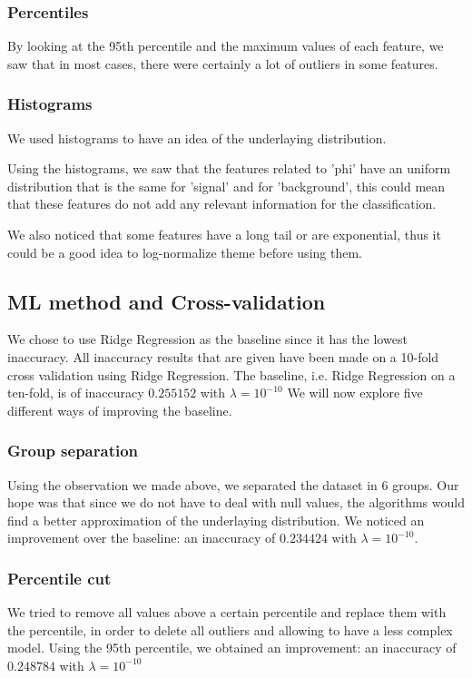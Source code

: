 \documentclass[10pt,conference,compsocconf]{IEEEtran}
\begin{document}
\subsubsection{Percentiles}

By looking at the 95th percentile and the maximum values of each feature, we saw
that in most cases, there were certainly a lot of outliers in some features.

\subsubsection{Histograms}

We used histograms to have an idea of the underlaying distribution.

Using the histograms, we saw that the features related to 'phi' have an uniform
distribution that is the same for 'signal' and for 'background', this could mean
that these features do not add any relevant information for the classification.

We also noticed that some features have a long tail or are exponential, thus it could be a good
idea to log-normalize theme before using them.

\subsection{ML method and Cross-validation}
We chose to use Ridge Regression as the baseline since it has the lowest
inaccuracy.
All inaccuracy results that are given have been made on a 10-fold cross validation
using Ridge Regression. The baseline, i.e. Ridge Regression on a ten-fold, is
of inaccuracy $0.255152$ with $\lambda = 10^{-10}$
We will now explore five different ways of improving the baseline.

\subsubsection{Group separation}
Using the observation we made above, we separated the dataset in 6 groups. Our
hope was that since we do not have to deal with null values, the algorithms
would find a better approximation of the underlaying distribution. We noticed an
improvement over the baseline: an inaccuracy of $0.234424$ with $\lambda =
10^{-10}$.

\subsubsection{Percentile cut}
We tried to remove all values above a certain percentile and replace them with
the percentile, in order to delete all outliers and allowing to have a less
complex model. Using the 95th percentile, we obtained an improvement: an
inaccuracy of $0.248784$ with $\lambda = 10^{-10}$
\end{document}
